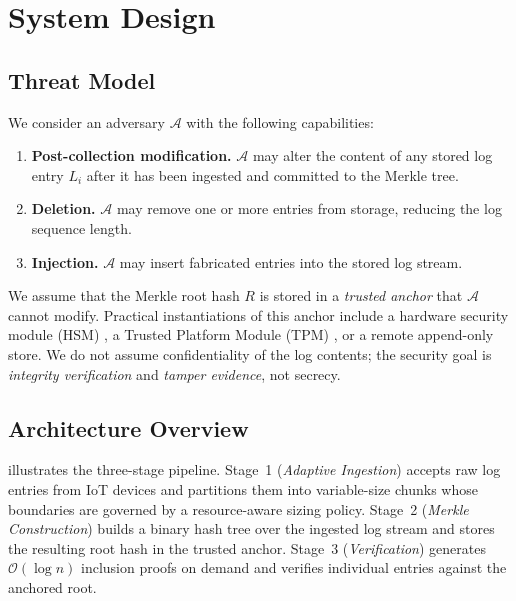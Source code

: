 \documentclass[preprint,12pt]{elsarticle}
\begin{document}
\section{System Design}
\label{sec:design}

\subsection{Threat Model}
\label{sec:threat}

We consider an adversary $\mathcal{A}$ with the following capabilities:

\begin{enumerate}[leftmargin=*, label=(\roman*)]
  \item \textbf{Post-collection modification.}
    $\mathcal{A}$ may alter the content of any stored log entry $L_i$ after it has been ingested and committed to the Merkle tree.

  \item \textbf{Deletion.}
    $\mathcal{A}$ may remove one or more entries from storage, reducing the log sequence length.

  \item \textbf{Injection.}
    $\mathcal{A}$ may insert fabricated entries into the stored log stream.
\end{enumerate}

We assume that the Merkle root hash $R$ is stored in a \emph{trusted anchor} that $\mathcal{A}$ cannot modify.
Practical instantiations of this anchor include a hardware security module (HSM) \citep{fips1403}, a Trusted Platform Module (TPM) \citep{sinha2014continuous}, or a remote append-only store.
We do not assume confidentiality of the log contents; the security goal is \emph{integrity verification} and \emph{tamper evidence}, not secrecy.

\subsection{Architecture Overview}

 illustrates the three-stage pipeline.
Stage~1 (\emph{Adaptive Ingestion}) accepts raw log entries from IoT devices and partitions them into variable-size chunks whose boundaries are governed by a resource-aware sizing policy.
Stage~2 (\emph{Merkle Construction}) builds a binary hash tree over the ingested log stream and stores the resulting root hash in the trusted anchor.
Stage~3 (\emph{Verification}) generates $\mathcal{O}(\log n)$ inclusion proofs on demand and verifies individual entries against the anchored root.
\end{document}
